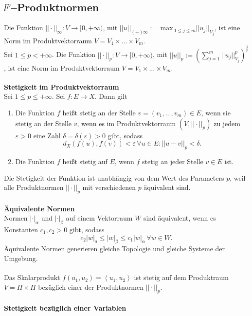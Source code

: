 \documentclass[a4paper,12pt]{article}
\begin{document}
\subsection{$l^p$--Produktnormen}
Die Funktion $||\cdot ||_\infty:V\rightarrow [0,+\infty)$, mit $||u||_{(+)\infty}:=\,\text{max}\,_{1\leq j\leq m}||u_j||_{V_j}$, ist eine Norm im Produktvektorraum $V=V_1\times \hdots \times V_m$.\\\indent
Sei $1\leq p<+\infty$. Die Funktion $||\cdot ||_p:V\rightarrow [0,+\infty)$, mit $||u||_p:=\left(\sum_{j=1}^{m}||u_j||_{V_j}^p\right)^{\tfrac{1}{p}}$, ist eine Norm im Produktvektorraum $V=V_1\times \hdots \times V_m$.
\\\hfill\\\textbf{Stetigkeit im Produktvektorraum}\\ 
Sei $1\leq p\leq +\infty$. Sei $f:E\rightarrow X$. Dann gilt
\begin{enumerate}[label=\arabic*.]
        \item Die Funktion $f$ heißt stetig an der Stelle $v=(v_1,\hdots ,v_m) \in E$, wenn sie stetig an der Stelle $v$, wenn es im Produktvektorraum $(V,||\cdot ||_p)$ zu jedem $\varepsilon >0$ eine Zahl $\delta =\delta (\varepsilon )>0$ gibt, sodass
                \[ 
                        d_X\left(f(u),f(v)\right)<\varepsilon \,\forall u \in E:||u-v||_p<\delta 
                .\] 
        \item Die Funktion $f$ heißt stetig auf $E$, wenn $f$ stetig an jeder Stelle $v \in E$ ist.
\end{enumerate}
Die Stetigkeit der Funktion ist unabhängig von dem Wert des Parameters $p$, weil alle Produktnormen $||\cdot ||_p$ mit verschiedenen $p$ äquivalent sind.
\\\hfill\\\textbf{Äquivalente Normen}\\ 
Normen $|\cdot |_\alpha $ und $|\cdot |_\beta $ auf einem Vektorraum $W$ sind äquivalent, wenn es Konstanten $c_1,c_2>0$ gibt, sodass
\[ 
        c_2|w|_a\leq |w|_\beta \leq c_1|w|_\alpha \,\forall w \in W
.\] 
Äquivalente Normen generieren gleiche Topologie und gleiche Systeme der Umgebung.\\\\
Das Skalarprodukt $f(u_1,u_2)=\left\langle u_1,u_2\right\rangle $ ist stetig auf dem Produktraum $V=H\times H$ bezüglich einer der Produktnormen $||\cdot ||_p$.
\\\hfill\\\textbf{Stetigkeit bezüglich einer Variablen}\\ 
\end{document}
